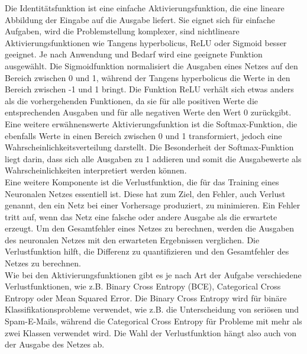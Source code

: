Die Identitätsfunktion ist eine einfache Aktivierungsfunktion, die eine lineare Abbildung der Eingabe auf die Ausgabe liefert. Sie eignet sich für einfache Aufgaben, wird die Problemstellung komplexer, sind nichtlineare Aktivierungsfunktionen wie Tangens hyperbolicus, \ac{ReLU} oder Sigmoid besser geeignet. Je nach Anwendung und Bedarf wird eine geeignete Funktion ausgewählt. Die Sigmoidfunktion normalisiert die Ausgaben eines Netzes auf den Bereich zwischen 0 und 1, während der Tangens hyperbolicus die Werte in den Bereich zwischen -1 und 1 bringt. Die Funktion \ac{ReLU} verhält sich etwas anders als die vorhergehenden Funktionen, da sie für alle positiven Werte die entsprechenden Ausgaben und für alle negativen Werte den Wert 0 zurückgibt. Eine weitere erwähnenswerte Aktivierungsfunktion ist die Softmax-Funktion, die ebenfalls Werte in einen Bereich zwischen 0 und 1 transformiert, jedoch eine Wahrscheinlichkeitsverteilung darstellt. Die Besonderheit der Softmax-Funktion liegt darin, dass sich alle Ausgaben zu 1 addieren und somit die Ausgabewerte als Wahrscheinlichkeiten interpretiert werden können. \cite[vgl.][]{Frick2021}\\
Eine weitere Komponente ist die Verlustfunktion, die für das Training eines Neuronalen Netzes essentiell ist. Diese hat zum Ziel, den Fehler, auch Verlust genannt, den ein Netz bei einer Vorhersage produziert, zu minimieren. Ein Fehler tritt auf, wenn das Netz eine falsche oder andere Ausgabe als die erwartete erzeugt. Um den Gesamtfehler eines Netzes zu berechnen, werden die Ausgaben des neuronalen Netzes mit den erwarteten Ergebnissen verglichen. Die Verlustfunktion hilft, die Differenz zu quantifizieren und den Gesamtfehler des Netzes zu berechnen. \cite{Frick2021}\\
Wie bei den Aktivierungsfunktionen gibt es je nach Art der Aufgabe verschiedene Verlustfunktionen, wie z.B. Binary Cross Entropy (BCE), Categorical Cross Entropy oder Mean Squared Error. Die Binary Cross Entropy wird für binäre Klassifikationsprobleme verwendet, wie z.B. die Unterscheidung von seriösen und Spam-E-Mails, während die Categorical Cross Entropy für Probleme mit mehr als zwei Klassen verwendet wird. Die Wahl der Verlustfunktion hängt also auch von der Ausgabe des Netzes ab. 

